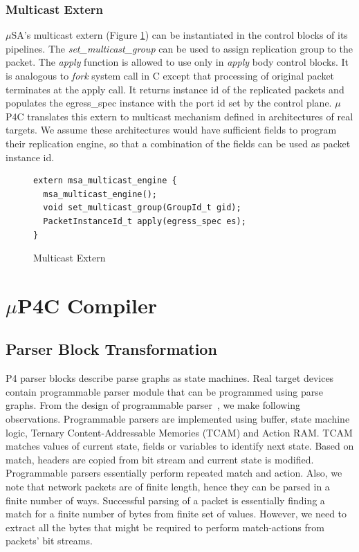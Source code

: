 \documentclass{hotnets19}
\begin{document}
\subsubsection{Multicast Extern}
$\mu$SA's multicast extern (Figure \ref{fig:msa-multicast-extern}) can be instantiated in the control blocks of its pipelines.
The \emph{set\_multicast\_group} can be used to assign replication group to the packet. 
The \emph{apply} function is allowed to use only in \emph{apply} body control blocks. 
It is analogous to \emph{fork} system call in C except that processing of original packet terminates at the apply call.
It returns instance id of the replicated packets and populates the egress\_spec instance with the port id set by the control plane.
$\mu$P4C translates this extern to multicast mechanism defined in architectures of real targets.
We assume these architectures would have sufficient fields to program their replication engine, so that a combination of the fields can be used as packet instance id.
\begin{figure}[!h]
\begin{lstlisting}[frame=none]
extern msa_multicast_engine {
  msa_multicast_engine();
  void set_multicast_group(GroupId_t gid);
  PacketInstanceId_t apply(egress_spec es);
}
\end{lstlisting}
\caption{Multicast Extern}
\label{fig:msa-multicast-extern}
\end{figure}

\section{$\mu$P4C Compiler}
\label{section-mp4c-compiler}

\subsection{Parser Block Transformation}
\label{subsection:parser-block-transformation}
P4 parser blocks describe parse graphs as state machines.
Real target devices contain programmable parser module that can be programmed using parse graphs.
From the design of programmable parser~\cite{6665172}, we make following observations.
Programmable parsers are implemented using buffer, state machine logic, Ternary Content-Addressable Memories (TCAM) and Action RAM. 
TCAM matches values of current state, fields or variables to identify next state. 
Based on match, headers are copied from bit stream and current state is modified.
Programmable parsers essentially perform repeated match and action.
Also, we note that network packets are of finite length, hence they can be parsed in a finite number of ways.
Successful parsing of a packet is essentially finding a match for a finite number of bytes from finite set of values.
However, we need to extract all the bytes that might be required to perform match-actions from packets' bit streams.
\end{document}
